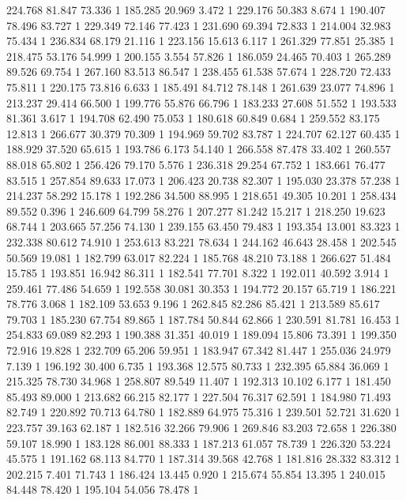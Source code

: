 	224.768	81.847	73.336	1
	185.285	20.969	3.472	1
	229.176	50.383	8.674	1
	190.407	78.496	83.727	1
	229.349	72.146	77.423	1
	231.690	69.394	72.833	1
	214.004	32.983	75.434	1
	236.834	68.179	21.116	1
	223.156	15.613	6.117	1
	261.329	77.851	25.385	1
	218.475	53.176	54.999	1
	200.155	3.554	57.826	1
	186.059	24.465	70.403	1
	265.289	89.526	69.754	1
	267.160	83.513	86.547	1
	238.455	61.538	57.674	1
	228.720	72.433	75.811	1
	220.175	73.816	6.633	1
	185.491	84.712	78.148	1
	261.639	23.077	74.896	1
	213.237	29.414	66.500	1
	199.776	55.876	66.796	1
	183.233	27.608	51.552	1
	193.533	81.361	3.617	1
	194.708	62.490	75.053	1
	180.618	60.849	0.684	1
	259.552	83.175	12.813	1
	266.677	30.379	70.309	1
	194.969	59.702	83.787	1
	224.707	62.127	60.435	1
	188.929	37.520	65.615	1
	193.786	6.173	54.140	1
	266.558	87.478	33.402	1
	260.557	88.018	65.802	1
	256.426	79.170	5.576	1
	236.318	29.254	67.752	1
	183.661	76.477	83.515	1
	257.854	89.633	17.073	1
	206.423	20.738	82.307	1
	195.030	23.378	57.238	1
	214.237	58.292	15.178	1
	192.286	34.500	88.995	1
	218.651	49.305	10.201	1
	258.434	89.552	0.396	1
	246.609	64.799	58.276	1
	207.277	81.242	15.217	1
	218.250	19.623	68.744	1
	203.665	57.256	74.130	1
	239.155	63.450	79.483	1
	193.354	13.001	83.323	1
	232.338	80.612	74.910	1
	253.613	83.221	78.634	1
	244.162	46.643	28.458	1
	202.545	50.569	19.081	1
	182.799	63.017	82.224	1
	185.768	48.210	73.188	1
	266.627	51.484	15.785	1
	193.851	16.942	86.311	1
	182.541	77.701	8.322	1
	192.011	40.592	3.914	1
	259.461	77.486	54.659	1
	192.558	30.081	30.353	1
	194.772	20.157	65.719	1
	186.221	78.776	3.068	1
	182.109	53.653	9.196	1
	262.845	82.286	85.421	1
	213.589	85.617	79.703	1
	185.230	67.754	89.865	1
	187.784	50.844	62.866	1
	230.591	81.781	16.453	1
	254.833	69.089	82.293	1
	190.388	31.351	40.019	1
	189.094	15.806	73.391	1
	199.350	72.916	19.828	1
	232.709	65.206	59.951	1
	183.947	67.342	81.447	1
	255.036	24.979	7.139	1
	196.192	30.400	6.735	1
	193.368	12.575	80.733	1
	232.395	65.884	36.069	1
	215.325	78.730	34.968	1
	258.807	89.549	11.407	1
	192.313	10.102	6.177	1
	181.450	85.493	89.000	1
	213.682	66.215	82.177	1
	227.504	76.317	62.591	1
	184.980	71.493	82.749	1
	220.892	70.713	64.780	1
	182.889	64.975	75.316	1
	239.501	52.721	31.620	1
	223.757	39.163	62.187	1
	182.516	32.266	79.906	1
	269.846	83.203	72.658	1
	226.380	59.107	18.990	1
	183.128	86.001	88.333	1
	187.213	61.057	78.739	1
	226.320	53.224	45.575	1
	191.162	68.113	84.770	1
	187.314	39.568	42.768	1
	181.816	28.332	83.312	1
	202.215	7.401	71.743	1
	186.424	13.445	0.920	1
	215.674	55.854	13.395	1
	240.015	84.448	78.420	1
	195.104	54.056	78.478	1
